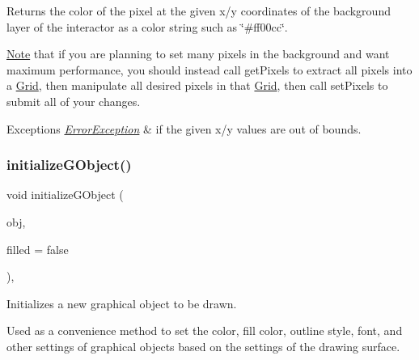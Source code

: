 Returns the color of the pixel at the given x/y coordinates of the background layer of the interactor as a color string such as \char`\"{}\#ff00cc\char`\"{}. 

\mbox{\hyperlink{classNote}{Note}} that if you are planning to set many pixels in the background and want maximum performance, you should instead call get\+Pixels to extract all pixels into a \mbox{\hyperlink{classGrid}{Grid}}, then manipulate all desired pixels in that \mbox{\hyperlink{classGrid}{Grid}}, then call set\+Pixels to submit all of your changes.


\begin{DoxyExceptions}{Exceptions}
{\em \mbox{\hyperlink{classErrorException}{Error\+Exception}}} & if the given x/y values are out of bounds. \\
\hline
\end{DoxyExceptions}
\mbox{\label{classGDrawingSurface_a814498efebc5586645159cd22990cf61}} 
\subsubsection{\texorpdfstring{initialize\+G\+Object()}{initializeGObject()}\hspace{0.1cm}{\footnotesize\ttfamily [1/2]}}
{\footnotesize\ttfamily void initialize\+G\+Object (\begin{DoxyParamCaption}\item[{\mbox{\hyperlink{classGObject}{G\+Object}} \&}]{obj,  }\item[{bool}]{filled = {\ttfamily false} }\end{DoxyParamCaption})\hspace{0.3cm}{\ttfamily [protected]}, {\ttfamily [virtual]}}



Initializes a new graphical object to be drawn. 

Used as a convenience method to set the color, fill color, outline style, font, and other settings of graphical objects based on the settings of the drawing surface. \mbox{\label{classGDrawingSurface_a43e6bc951980da061ddc40407daee227}} 
